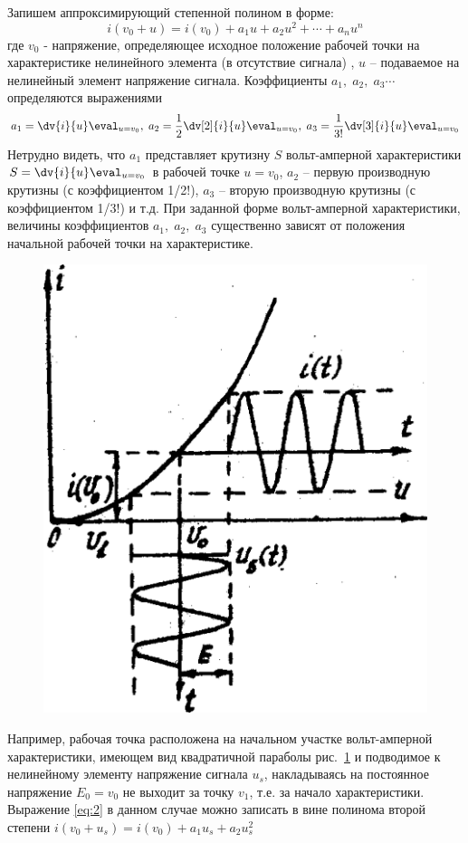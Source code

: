 Запишем аппроксимирующий степенной полином в форме:
\begin{equation}
i(v_0+u)=i(v_0)+a_1u+a_2u^2+\cdots+a_nu^n
\label{eq:2}
\end{equation}
где $v_0$ - напряжение, определяющее исходное положение рабочей точки на характеристике нелинейного элемента (в отсутствие сигнала) , $u$ -- подаваемое на нелинейный элемент напряжение сигнала. Коэффициенты $a_1,\;a_2,\;a_3\cdots$ определяются выражениями
\begin{equation}
a_1=\dv{i}{u} \eval_{u=v_0}, \; 
a_2=\frac12 \dv[2]{i}{u} \eval_{u=v_0},\;
a_3=\frac1{3!}\dv[3]{i}{u}\eval_{u=v_0}
\label{eq:3}
\end{equation}
Нетрудно видеть, что $a_1$ представляет крутизну $S$ вольт-амперной характеристики $S=\dv{i}{u}\eval_{u=v_0}$ в рабочей точке $u=v_0$,
$a_2$ -- первую производную крутизны (с коэффициентом 1/2!),
$a_3$ -- вторую производную крутизны (с коэффициентом 1/3!) и т.д. При заданной форме вольт-амперной характеристики, величины коэффициентов $a_1,\;a_2,\;a_3$ существенно зависят от положения начальной рабочей точки на характеристике.
\begin{figure}
	\centering
	\includegraphics[width=0.6\linewidth]{picture/pic1}
	\caption{}
	\label{pic:1}
\end{figure}
\newline
Например, рабочая точка расположена на начальном участке вольт-амперной характеристики, имеющем вид квадратичной параболы рис.~\ref{pic:1} и подводимое к нелинейному элементу напряжение сигнала $u_s$, накладываясь на постоянное напряжение $E_0=v_0$ не выходит за точку $v_1$, т.е. за начало характеристики.
Выражение \eqref{eq:2} в данном случае можно записать в вине полинома второй степени $i(v_0+u_s)=i(v_0)+a_1u_s+a_2u_s^2$ 

